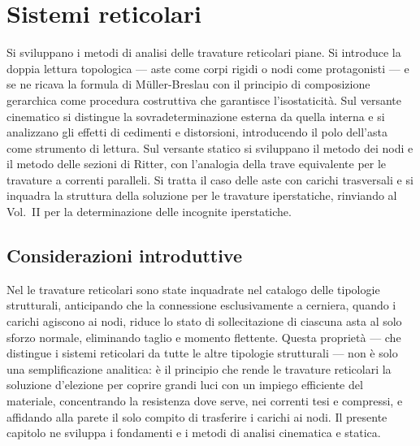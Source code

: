 \graphicspath{{Parti/P04-Travi_rigide/C05-Sistemi_reticolari/Figure/}}
\chapter{Sistemi reticolari}
\label{cap:reticolari}

\begin{sommario}
	Si sviluppano i metodi di analisi delle travature
	reticolari piane. Si introduce la doppia lettura
	topologica --- aste come corpi rigidi o nodi come
	protagonisti --- e se ne ricava la formula di
	M\"{u}ller-Breslau con il principio di composizione
	gerarchica come procedura costruttiva che garantisce
	l'isostaticità.
	Sul versante cinematico si distingue la
	sovradeterminazione esterna da quella interna
	e si analizzano gli effetti di cedimenti e
	distorsioni, introducendo il polo dell'asta
	come strumento di lettura.
	Sul versante statico si sviluppano il metodo
	dei nodi e il metodo delle sezioni di Ritter,
	con l'analogia della trave equivalente per le
	travature a correnti paralleli.
	Si tratta il caso delle aste con carichi
	trasversali e si inquadra la struttura della
	soluzione per le travature iperstatiche,
	rinviando al Vol.~II per la determinazione
	delle incognite iperstatiche.
\end{sommario}




\section*{Considerazioni introduttive}
\label{sec:raccordo_reticolari}

Nel  le travature reticolari
sono state inquadrate nel catalogo delle tipologie
strutturali, anticipando che la connessione esclusivamente
a cerniera, quando i carichi agiscono ai nodi, riduce
lo stato di sollecitazione di ciascuna asta al solo
sforzo normale, eliminando taglio e momento flettente.
Questa proprietà --- che distingue i sistemi reticolari
da tutte le altre tipologie strutturali --- non è solo
una semplificazione analitica: è il principio che rende
le travature reticolari la soluzione d'elezione per
coprire grandi luci con un impiego efficiente del
materiale, concentrando la resistenza dove serve,
nei correnti tesi e compressi, e affidando alla parete
il solo compito di trasferire i carichi ai nodi.
Il presente capitolo ne sviluppa i fondamenti e i
metodi di analisi cinematica e statica.


